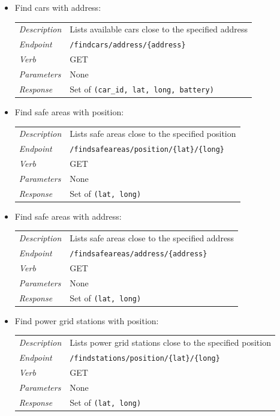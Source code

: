 \documentclass[english]{article}
\newcommand{\code}[1]{\texttt{#1}}
\begin{document}
\begin{itemize}
\begin{itemize}
	\item{Find cars with address:}\\
	\begin{tabular}{ | l l }
		\textit{Description} & Lists available cars close to the specified address\\
		\textit{Endpoint} & \code{/findcars/address/\{address\}} \\ 
		\textit{Verb} & GET \\  
		\textit{Parameters} & None \\
		\textit{Response} & Set of \code{(car\_id, lat, long, battery)}
	\end{tabular}
	
	\item{Find safe areas with position:}\\
	\begin{tabular}{ | l l }
		\textit{Description} & Lists safe areas close to the specified position\\
		\textit{Endpoint} & \code{/findsafeareas/position/\{lat\}/\{long\}} \\ 
		\textit{Verb} & GET \\  
		\textit{Parameters} & None \\
		\textit{Response} & Set of \code{(lat, long)}
	\end{tabular}

	\item{Find safe areas with address:}\\
	\begin{tabular}{ | l l }
		\textit{Description} & Lists safe areas close to the specified address\\
		\textit{Endpoint} & \code{/findsafeareas/address/\{address\}} \\ 
		\textit{Verb} & GET \\  
		\textit{Parameters} & None \\
		\textit{Response} & Set of \code{(lat, long)}
	\end{tabular}
	
	\item{Find power grid stations with position:}\\
	\begin{tabular}{ | l l }
		\textit{Description} & Lists power grid stations close to the specified position\\
		\textit{Endpoint} & \code{/findstations/position/\{lat\}/\{long\}} \\ 
		\textit{Verb} & GET \\  
		\textit{Parameters} & None \\
		\textit{Response} & Set of \code{(lat, long)}
	\end{tabular}


\end{itemize}
\end{itemize}
\end{document}
